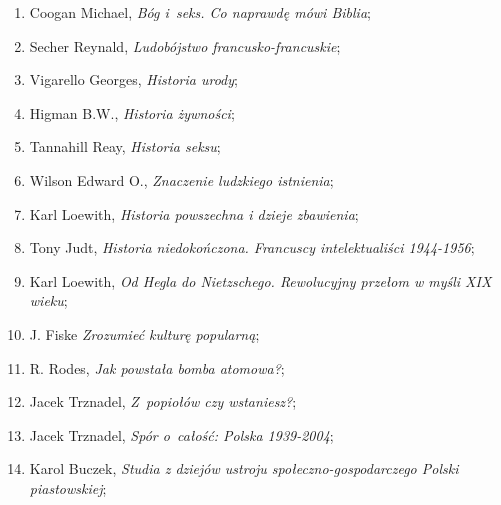 \documentclass[a4paper,11pt]{article}
\begin{document}
\begin{enumerate}
\item Coogan Michael, \textit{Bóg i~seks. Co naprawdę mówi Biblia};



\item Secher Reynald, \textit{Ludobójstwo francusko-francuskie};



\item Vigarello Georges, \textit{Historia urody};



\item Higman B.W., \textit{Historia żywności};



\item Tannahill Reay, \textit{Historia seksu};



\item Wilson Edward O., \textit{Znaczenie ludzkiego istnienia};



\item Karl Loewith, \textit{Historia powszechna i dzieje zbawienia};



\item Tony Judt, \textit{Historia niedokończona. Francuscy
    intelektualiści 1944-1956};



\item Karl Loewith, \textit{Od Hegla do Nietzschego. Rewolucyjny przełom
    w myśli XIX wieku};



\item J. Fiske \textit{Zrozumieć kulturę popularną};



\item R. Rodes, \textit{Jak powstała bomba atomowa?};



\item Jacek Trznadel, \textit{Z~popiołów czy wstaniesz?};



\item Jacek Trznadel, \textit{Spór o~całość: Polska 1939-2004};



\item Karol Buczek, \textit{Studia z dziejów ustroju
    społeczno-gospodarczego Polski piastowskiej};




\end{enumerate}
\end{document}
